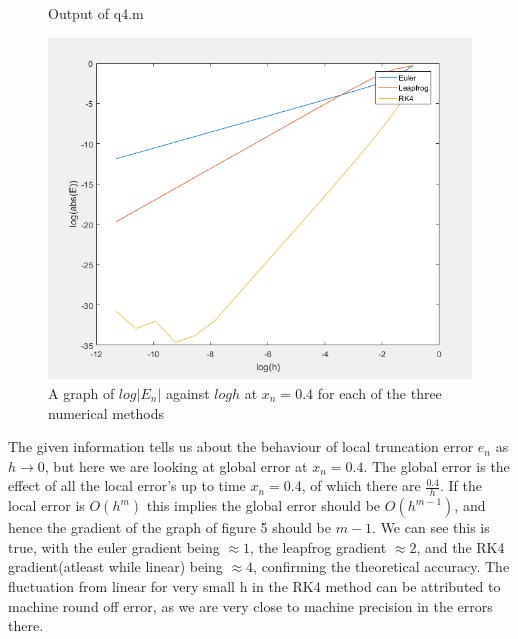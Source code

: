 \documentclass[10pt,a4paper]{report}
\begin{document}
\begin{figure}[ht]
\begin{minipage}[b]{0.4\linewidth}
\begin{table}[H]
\caption{Output of q4.m}

\vspace{0.5cm}

\end{table}

\end{minipage}
\hspace{0.5cm}
\begin{minipage}[b]{0.6\linewidth}
\centering
\includegraphics[width=\textwidth]{q4}
\caption{A graph of $log|E_n|$ against $logh$  at $x_n=0.4$ for each of the three numerical methods}

\end{minipage}
\end{figure}



The given information tells us about the behaviour of local truncation error $e_n$ as $h \rightarrow 0$, but here we are looking at global error at $x_n=0.4$. The global error is the effect of all the local error's up to time $x_n=0.4$, of which there are $\frac{0.4}{h}$. If the local error is $O(h^m)$ this implies the global error should be $O(h^{m-1})$, and hence the gradient of the graph of figure 5 should be $m-1$. We can see this is  true, with the euler gradient being $\approx 1$, the leapfrog gradient $\approx 2$, and the RK4 gradient(atleast while linear) being $\approx 4$, confirming the theoretical accuracy. The fluctuation from linear for very small h in the RK4 method can be attributed to machine round off error, as we are very close to machine precision in the errors there.
\end{document}
